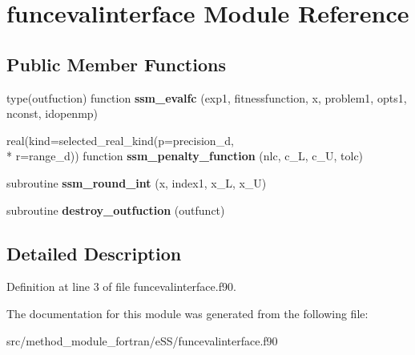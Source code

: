 \hypertarget{classfuncevalinterface}{\section{funcevalinterface Module Reference}
\label{classfuncevalinterface}
}
\subsection*{Public Member Functions}
\begin{DoxyCompactItemize}
\item 
\hypertarget{classfuncevalinterface_a91ef373daeff40d3847e9f220cc2f5b0}{type(outfuction) function {\bfseries ssm\-\_\-evalfc} (exp1, fitnessfunction, x, problem1, opts1, nconst, idopenmp)}\label{classfuncevalinterface_a91ef373daeff40d3847e9f220cc2f5b0}

\item 
\hypertarget{classfuncevalinterface_ad96e3c10d06db27d54282295be2468d2}{real(kind=selected\-\_\-real\-\_\-kind(p=precision\-\_\-d, \\*
r=range\-\_\-d)) function {\bfseries ssm\-\_\-penalty\-\_\-function} (nlc, c\-\_\-\-L, c\-\_\-\-U, tolc)}\label{classfuncevalinterface_ad96e3c10d06db27d54282295be2468d2}

\item 
\hypertarget{classfuncevalinterface_a5ba2361ec6c27d027d4a136ca33c45de}{subroutine {\bfseries ssm\-\_\-round\-\_\-int} (x, index1, x\-\_\-\-L, x\-\_\-\-U)}\label{classfuncevalinterface_a5ba2361ec6c27d027d4a136ca33c45de}

\item 
\hypertarget{classfuncevalinterface_a3e5253a4c0527a8b3910d0ae59c347bd}{subroutine {\bfseries destroy\-\_\-outfuction} (outfunct)}\label{classfuncevalinterface_a3e5253a4c0527a8b3910d0ae59c347bd}

\end{DoxyCompactItemize}


\subsection{Detailed Description}


Definition at line 3 of file funcevalinterface.\-f90.



The documentation for this module was generated from the following file\-:\begin{DoxyCompactItemize}
\item 
src/method\-\_\-module\-\_\-fortran/e\-S\-S/funcevalinterface.\-f90\end{DoxyCompactItemize}
